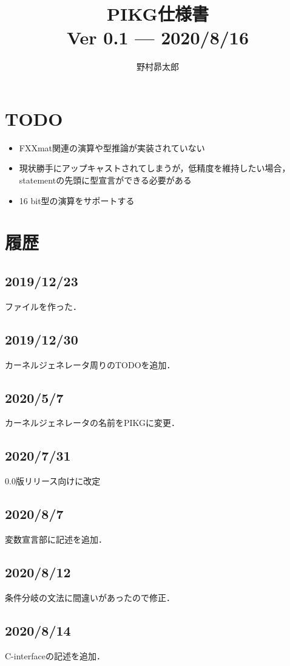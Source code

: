 \documentclass{article}
\begin{document}
%
\title{PIKG仕様書\\
{\large 
Ver 0.1 --- 2020/8/16\\
}
}
\author{野村昴太郎}
\maketitle
\thispagestyle{empty}

\newpage
\tableofcontents
\newpage

\section{TODO}
 \begin{itemize}
  \item FXXmat関連の演算や型推論が実装されていない
  \item 現状勝手にアップキャストされてしまうが，低精度を維持したい場合，statementの先頭に型宣言ができる必要がある
  \item 16 bit型の演算をサポートする
 \end{itemize}
\section{履歴}
\label{sect:4}
\subsection{2019/12/23}
ファイルを作った．
\subsection{2019/12/30}
カーネルジェネレータ周りのTODOを追加．
\subsection{2020/5/7}
カーネルジェネレータの名前をPIKGに変更．
\subsection{2020/7/31}
0.0版リリース向けに改定
\subsection{2020/8/7}
変数宣言部に記述を追加．
\subsection{2020/8/12}
条件分岐の文法に間違いがあったので修正．
\subsection{2020/8/14}
C-interfaceの記述を追加．
\end{document}
